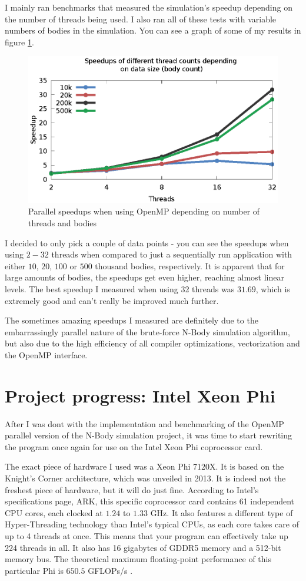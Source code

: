 \documentclass[journal]{IEEEtran}
\begin{document}
			I mainly ran benchmarks that measured the simulation's speedup depending on the number of threads being used. I also ran all of these tests with variable numbers of bodies in the simulation. You can see a graph of some of my results in figure \ref{parspeedup}. 
			
			\begin{figure}[ht]			
				\centering
				\includegraphics[width=.5\textwidth]{gnuplot/speedup.eps}
				\caption{\label{parspeedup}Parallel speedups when using OpenMP depending on number of threads and bodies}
			\end{figure} 
			
			I decided to only pick a couple of data points - you can see the speedups when using $2-32$ threads when compared to just a sequentially run application with either $10$, $20$, $100$ or $500$ thousand bodies, respectively. It is apparent that for large amounts of bodies, the speedups get even higher, reaching almost linear levels. The best speedup I measured when using 32 threads was $31.69$, which is extremely good and can't really be improved much further.
			
			The sometimes amazing speedups I measured are definitely due to the embarrassingly parallel nature of the brute-force N-Body simulation algorithm, but also due to the high efficiency of all compiler optimizations, vectorization and the OpenMP interface.
			
	\section{Project progress: Intel Xeon Phi}
	\label{phisection}
		
		After I was dont with the implementation and benchmarking of the OpenMP parallel version of the N-Body simulation project, it was time to start rewriting the program once again for use on the Intel Xeon Phi coprocessor card.
		
		The exact piece of hardware I used was a Xeon Phi 7120X. It is based on the Knight's Corner architecture, which was unveiled in 2013. It is indeed not the freshest piece of hardware, but it will do just fine.
		According to Intel's specifications page, ARK\cite{ark}, this specific coprocessor card contains 61 independent CPU cores, each clocked at $1.24$ to $1.33$ GHz. It also features a different type of Hyper-Threading technology than Intel's typical CPUs, as each core takes care of up to 4 threads at once. This means that your program can effectively take up 224 threads in all. It also has 16 gigabytes of GDDR5 memory and a 512-bit memory bus. The theoretical maximum floating-point performance of this particular Phi is $650.5$ GFLOPs/s \cite{tpu}.
		
\end{document}
